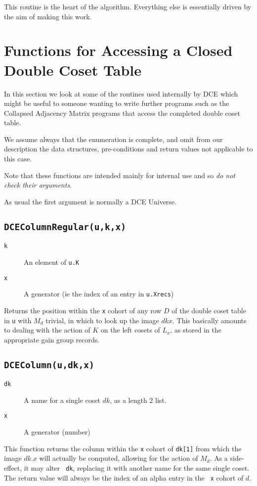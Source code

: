 This routine is the heart of the algorithm. Everything else is
essentially driven by the aim of making this work.

\section{Functions for Accessing a Closed Double Coset Table}

In this section we look at some of the routines used internally by DCE
which might be useful to someone wanting to write further programs
such as the Collapsed Adjacency Matrix programs that access the
completed double coset table.

We assume always that the enumeration is complete, and omit from our
description the data structures, pre-conditions and return values not
applicable to this case.

Note that these functions are intended mainly for internal use and so
{\em do not check their arguments}.

As usual the first argument is normally a DCE Universe.

\subsection{\tt DCEColumnRegular(u,k,x)}
\begin{description}
\item[\tt k] An element of {\tt u.K}
\item[\tt x] A generator (ie the index of an entry in {\tt u.Xrecs})
\end{description}
Returns the position within the {\tt x} cohort of any row $D$ of the
double coset table in {\tt u} with $M_d$ trivial, in which to look up
the image $dkx$. This basically amounts to dealing with the action of
$K$ on the left cosets of $L_x$, as stored in the appropriate gain
group records.
\subsection{\tt DCEColumn(u,dk,x)}
\begin{description}
\item[\tt dk] A name for a single coset $dk$, as a length 2 list.
\item[\tt x] A generator (number)
\end{description}
This function returns the column within the {\tt x} cohort of 
{\tt dk[1]} from which the image $dk.x$ will actually be computed,
allowing for the action of $M_d$. As a side-effect, it may alter {\tt
dk}, replacing it with another name for the same single coset. The
return value will  always be the index of an alpha entry in the {\tt
x} cohort of $d$.
